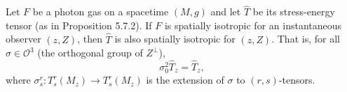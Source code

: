 Let $F$ be a photon gas on a spacetime $(M, g)$ and let $\hat{T}$ be its stress-energy tensor (as in Proposition 5.7.2). If $F$ is spatially isotropic for an instantaneous observer $(z, Z)$, then $\hat{T}$ is also spatially isotropic for $(z, Z)$. That is, for all $\sigma \in \mathcal{O}^3$ (the orthogonal group of $Z^\perp$),
$$\sigma_0^2 \hat{T}_z = \hat{T}_z,$$
where $\sigma_s^r: T_s^r(M_z) \to T_s^r(M_z)$ is the extension of $\sigma$ to $(r,s)$-tensors.
